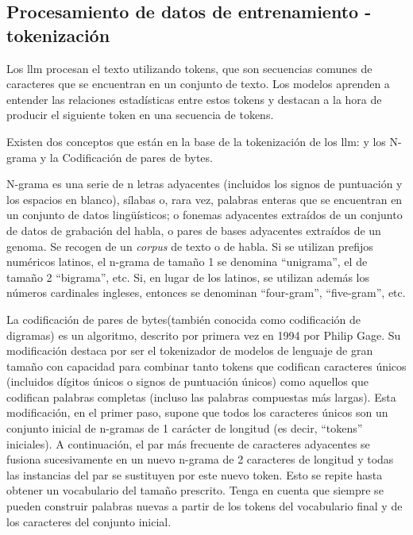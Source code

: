 
\subsection{Procesamiento de datos de entrenamiento - tokenización}

Los \acrlong{llm} procesan el texto utilizando tokens, que son secuencias comunes de caracteres que se encuentran en un conjunto de texto. Los modelos aprenden a entender las relaciones estadísticas entre estos tokens y destacan a la hora de producir el siguiente token en una secuencia de tokens\cite{OpenAI_Tokenizer}.


Existen dos conceptos que están en la base de la tokenización de los \acrshort{llm}: y los N-grama y la Codificación de pares de bytes.

N-grama es una serie de n letras adyacentes (incluidos los signos de puntuación y los espacios en blanco), sílabas o, rara vez, palabras enteras que se encuentran en un conjunto de datos lingüísticos; o fonemas adyacentes extraídos de un conjunto de datos de grabación del habla, o pares de bases adyacentes extraídos de un genoma. Se recogen de un \textit{corpus} de texto o de habla. Si se utilizan prefijos numéricos latinos, el n-grama de tamaño 1 se denomina ``unigrama'', el de tamaño 2 ``bigrama'', etc. Si, en lugar de los latinos, se utilizan además los números cardinales ingleses, entonces se denominan ``four-gram'', ``five-gram'', etc. 

La codificación de pares de bytes(también conocida como codificación de digramas) es un algoritmo, descrito por primera vez en 1994 por Philip Gage\cite{Gage_Compresion}. Su modificación destaca por ser el tokenizador de modelos de lenguaje de gran tamaño con capacidad para combinar tanto tokens que codifican caracteres únicos (incluidos dígitos únicos o signos de puntuación únicos) como aquellos que codifican palabras completas (incluso las palabras compuestas más largas). Esta modificación, en el primer paso, supone que todos los caracteres únicos son un conjunto inicial de n-gramas de 1 carácter de longitud (es decir, ``tokens'' iniciales). A continuación, el par más frecuente de caracteres adyacentes se fusiona sucesivamente en un nuevo n-grama de 2 caracteres de longitud y todas las instancias del par se sustituyen por este nuevo token. Esto se repite hasta obtener un vocabulario del tamaño prescrito. Tenga en cuenta que siempre se pueden construir palabras nuevas a partir de los tokens del vocabulario final y de los caracteres del conjunto inicial.

